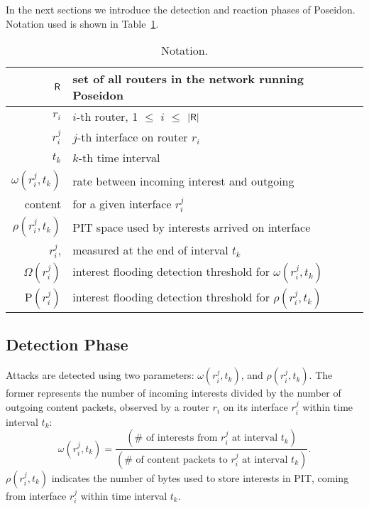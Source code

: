 \documentclass[10pt,conference,letterpaper]{IEEEtran}
\newcommand{\Rho}{\mathrm{P}}
\begin{document}
In the next sections we introduce the detection and reaction phases of Poseidon. 
Notation used is shown in Table~\ref{tab:notation}.

\begin{table}[h]
\begin{center} 
\resizebox{0.44\textwidth}{!} {
\begin{tabular}{|r|l|}
\hline
${\sf R}$ &  set of all routers in the network running Poseidon
\\ \hline
$r_i$ &  $i$-th router, 1 $\le$ $i$ $\le$ $|{\sf R}|$ 
\\ \hline
$r_i^j$&	 $j$-th interface on router $r_i$ 
\\ \hline
$t_k$   &	 $k$-th time interval 
\\ \hline
$\omega(r_i^j, t_k)$ & rate between incoming interest and outgoing \\content
			& for a given interface $r_i^j$
\\ \hline
$\rho(r_i^j, t_k)$   & PIT space used by interests arrived on interface\\ $r_i^j$, 
				    & measured at the end of interval $t_k$
\\ \hline
$\Omega(r_i^j)$   & interest flooding detection threshold for $\omega(r_i^j, t_k)$
\\ \hline
$\Rho(r_i^j)$  & interest flooding detection threshold for $\rho(r_i^j, t_k)$
\\ \hline
\end{tabular}
}
\end{center}
\caption{Notation.}
\label{tab:notation}

\end{table}






\subsection{Detection Phase}
\label{detectionphase}



Attacks are detected using two parameters: $\omega(r_i^j, t_k)$, and $\rho(r_i^j, t_k)$. 
The former represents the number of incoming interests divided by the number of outgoing 
content packets, observed by a router $r_i$ on its interface $r_i^j$ within time interval 
$t_k$:
\begin{equation*}
\omega(r_i^j, t_k) = \frac{(\# \mbox{ of interests from } r_i^j \mbox{ at interval } t_k)}
{(\# \mbox{ of content packets to } r_i^j \mbox{ at interval } t_k)}.
\end{equation*}
$\rho(r_i^j, t_k)$ indicates the number of bytes used to store interests in PIT, coming from interface $r_i^j$ within time interval $t_k$.
\end{document}
